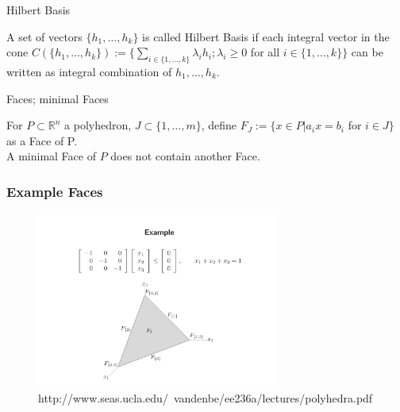 \documentclass{beamer}
\begin{document}
\begin{frame}
	
	\begin{block}{Hilbert Basis}

		A set of vectors $\{h_1, \dots, h_k\}$ is called Hilbert Basis if each integral vector in the cone $C(\{h_1, \dots, h_k\}) := \{\sum_{i\in \{ 1,\dots,k \}} \lambda_i h_i; \lambda_i \geq 0$ for all $i \in \{1,\dots,k\} \}$ can be written as integral combination of $h_1, \dots, h_k$.

	\end{block}

	\begin{block}{Faces; minimal Faces}

		For $P\subset \mathbb{R}^n$ a polyhedron, $J\subset \{1,\dots , m\}$, define $F_J := \{x \in P | a_i x = b_i$ for $i \in J\}$ as a Face of P.\\
		A minimal Face of $P$ does not contain another Face.

	\end{block}

\end{frame}

\begin{frame}
	\frametitle{Example Faces}
	
	\begin{figure}[htp]
		\centering
		\includegraphics[width=8cm]{images/faces_example.png}
		\caption{http://www.seas.ucla.edu/~vandenbe/ee236a/lectures/polyhedra.pdf}
		\label{fig:faces_example}
	\end{figure}
\end{frame}


\end{document}
